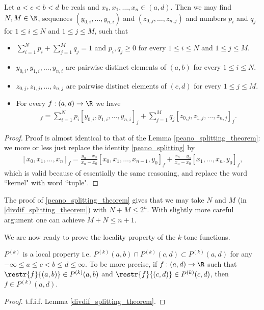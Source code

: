 \begin{lem}\label{divdif_splitting_theorem}
	Let $a < c < b < d$ be reals and $x_{0}, x_{1}, \ldots, x_{n} \in (a, d)$. Then we may find $N, M \in \N$, sequences $(y_{0, i}, \ldots, y_{n, i})$ and $(z_{0, j}, \ldots, z_{n, j})$ and numbers $p_{i}$ and $q_{j}$ for $1 \leq i \leq N$ and $1 \leq j \leq M$, such that
	\begin{itemize}
		\item $\sum_{i = 1}^{N} p_{i} + \sum_{j = 1}^{M} q_{j} = 1$ and $p_{i}, q_{j} \geq 0$ for every $1 \leq i \leq N$ and $1 \leq j \leq M$.
		\item $y_{0, i}, y_{1, i}, \ldots, y_{n, i}$ are pairwise distinct elements of $(a, b)$ for every $1 \leq i \leq N$.
		\item $z_{0, j}, z_{1, j}, \ldots, z_{n, j}$ are pairwise distinct elements of $(c, d)$ for every $1 \leq j \leq M$.
		\item For every $f : (a, d) \to \R$ we have
		\begin{align*}
			[x_{0}, x_{1}, \ldots, x_{n}]_{f} = \sum_{i = 1}^{N} p_{i} [y_{0, i}, y_{1, i}, \ldots, y_{n, i}]_{f} +  \sum_{j = 1}^{M} q_{j} [z_{0, j}, z_{1, j}, \ldots, z_{n, j}]_{f}.
		\end{align*}
	\end{itemize}
\end{lem}
\begin{proof}
	Proof is almost identical to that of the Lemma \ref{peano_splitting_theorem}: we more or less just replace the identity \ref{peano_splitting} by
	\begin{align}\label{divdif_splitting_property}
		[x_{0}, x_{1}, \ldots, x_{n}]_{f} = \frac{y_{0} - x_{0}}{x_{n} - x_{0}} [x_{0}, x_{1}, \ldots, x_{n - 1}, y_{0}]_{f} + \frac{x_{n} - y_{0}}{x_{n} - x_{0}} [x_{1}, \ldots, x_{n}, y_{0}]_{f},
	\end{align}
	which is valid because of essentially the same reasoning, and replace the word ``kernel" with word ``tuple".
\end{proof}

The proof of \ref{peano_splitting_theorem} gives that we may take $N$ and $M$ (in \ref{divdif_splitting_theorem}) with $N + M \leq 2^{n}$. With slightly more careful argument one can achieve $M + N \leq n + 1$.

We are now ready to prove the locality property of the $k$-tone functions.

\begin{prop}\label{k_tone_local}
	$P^{(k)}$ is a local property i.e. $P^{(k)}(a, b) \cap P^{(k)}(c, d) \subset P^{(k)}(a, d)$ for any $-\infty \leq a \leq c < b \leq d \leq \infty$. To be more precise, if $f : (a, d) \to \R$ such that $\restr{f}{(a, b)} \in P^{(k)}(a, b)$ and $\restr{f}{(c, d)} \in P^{(k)}(c, d)$, then $f \in P^{(k)}(a, d)$.
\end{prop}
\begin{proof}
	t.f.i.f. Lemma \ref{divdif_splitting_theorem}.
\end{proof}

